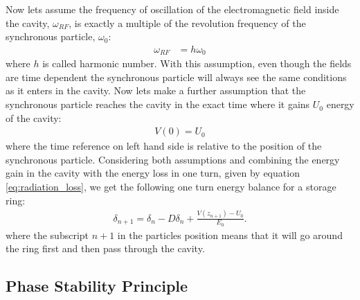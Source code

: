 \documentclass[
	12pt,				%
	openright,			%
	oneside,			%
	a4paper,		%
	chapter=TITLE,		%
	section=TITLE,		%
    brazil,				%
	english,			%
	sumario=tradicional,
	]{abntex2}
\begin{document}
	Now lets assume the frequency of oscillation of the electromagnetic field inside the cavity, $\omega_{RF}$, is exactly a multiple of the revolution frequency of the synchronous particle, $\omega_0$:
	\begin{align}\label{eq:harmonic_number}
		\omega_{RF} &= h\omega_0
	\end{align}
	where $h$ is called harmonic number. With this assumption, even though the fields are time dependent the synchronous particle will always see the same conditions as it enters in the cavity. Now lets make a further assumption that the synchronous particle reaches the cavity in the exact time where it gains $U_0$ energy of the cavity:
	\begin{align}
		V(0) = U_0
	\end{align}
	where the time reference on left hand side is relative to the position of the synchronous particle. Considering both assumptions and combining the energy gain in the cavity with the energy loss in one turn, given by equation \ref{eq:radiation_loss}, we get the following one turn energy balance for a storage ring:
	\begin{align}\label{eq:energy_balance}
		\delta_{n+1} = \delta_n - D\delta_n + \frac{V(z_{n+1})-U_0}{E_0}.
	\end{align}
	where the subscript $n+1$ in the particles position means that it will go around the ring first and then pass through the cavity.

	\subsection{Phase Stability Principle}
\end{document}
